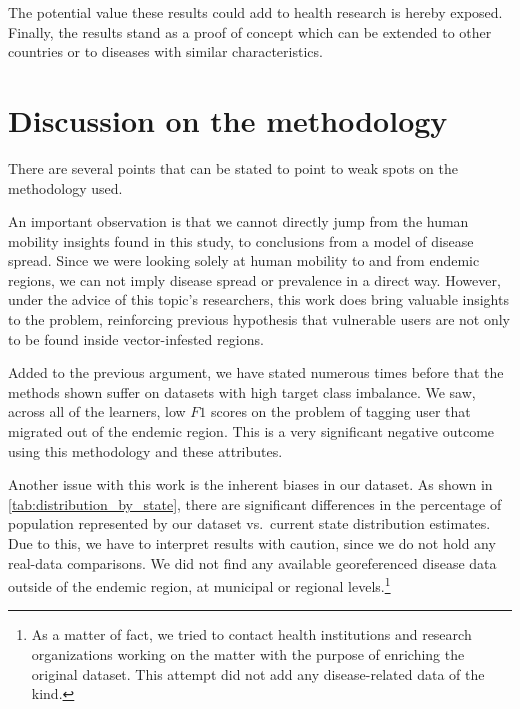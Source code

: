 The potential value these results could add to health research is hereby exposed.
Finally, the results stand as a proof of concept which can be extended to other countries or to diseases with similar characteristics.







\section{Discussion on the methodology}

There are several points that can be stated to point to weak spots on the methodology used.

An important observation is that we cannot directly jump from the human mobility insights found in this study, to conclusions from a model of disease spread.
Since we were looking solely at human mobility to and from endemic regions, we can not imply disease spread or prevalence in a direct way.
However, under the advice of this topic's researchers, this work does bring valuable insights to the problem, reinforcing previous hypothesis that vulnerable users are not only to be found inside vector-infested regions.


Added to the previous argument, we have stated numerous times before that the methods shown suffer on datasets with high target class imbalance.
We saw, across all of the learners, low $F1$ scores on the problem of tagging user that migrated out of the endemic region. This is a very significant negative outcome using this methodology and these attributes.

Another issue with this work is the inherent biases in our dataset.
As shown in \cref{tab:distribution_by_state}, there are significant differences in the percentage of population represented by our dataset vs.\ current state distribution estimates.
Due to this, we have to interpret results with caution, since we do not hold any real-data comparisons.
We did not find any available georeferenced disease data outside of the endemic region, at municipal or regional levels.\footnote{As a matter of fact, we tried to contact health institutions and research organizations working on the matter with the purpose of enriching the original dataset.
This attempt did not add any disease-related data of the kind.}

